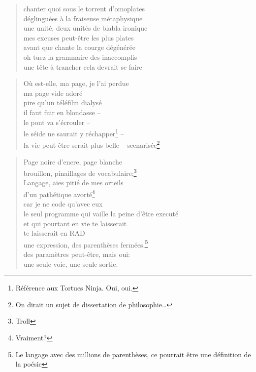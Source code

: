   \begin{verse}
    chanter quoi sous le torrent d’omoplates\\
    déglinguées à la fraiseuse métaphysique\\
    une unité, deux unités de blabla ironique\\
    mes excuses peut-être les plus plates\\
    avant que chante la courge dégénérée\\
    oh tuez la grammaire des inaccomplis\\
    une tête à trancher cela devrait se faire
  \end{verse}
  \begin{verse}
    Où est-elle, ma page, je l’ai perdue\\
    ma page vide adoré\\
    pire qu’un téléfilm dialysé\\
    il faut fuir en blondasse --\\
    le pont va s’écrouler --\\
    le séide ne saurait y réchapper\footnote{Référence aux Tortues Ninja. Oui, oui.} --\\
    la vie peut-être serait plus belle -- scenarisée\footnote{On dirait un sujet de dissertation de philosophie…}
  \end{verse}
  \begin{verse}
    Page noire d’encre, page blanche\\
    brouillon, pinaillages de vocabulaire;\footnote{Troll}\\
    Langage, aies pitié de mes orteils\\
    d’un pathétique avorté\footnote{Vraiment?}\\
    car je ne code qu’avec eux\\
    le seul programme qui vaille la peine d’être executé\\
    et qui pourtant en vie te laisserait\\
    te laisserait en RAD\\
    une expression, des parenthèses fermées,\footnote{Le langage avec des millions de parenthèses, ce pourrait être une définition de la poésie}\\
    des paramètres peut-être, mais oui:\\
    une seule voie, une seule sortie.
  \end{verse}
